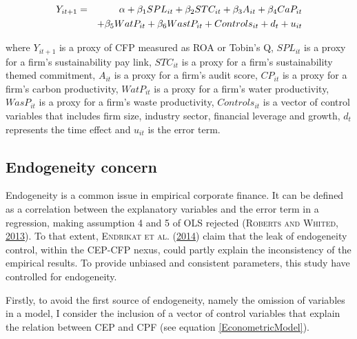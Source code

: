\documentclass[12pt,]{article}
\begin{document}
\begin{equation}
\centering
\begin{aligned}
Y_{it+1} & = & \alpha + \beta_{1} SPL_{it} + \beta_{2} STC_{it} + \beta_{3} A_{it} + \beta_{4} CaP_{it} \\
&& + { }  \beta_{5} WatP_{it} + \beta_{6} WastP_{it} + Controls_{it} + d_{t} + u_{it}
\label{EconometricModel}
\end{aligned}
\end{equation}

where \(Y_{it+1}\) is a proxy of CFP measured as ROA or Tobin's Q,
\(SPL_{it}\) is a proxy for a firm's sustainability pay link,
\(STC_{it}\) is a proxy for a firm's sustainability themed commitment,
\(A_{it}\) is a proxy for a firm's audit score, \(CP_{it}\) is a proxy
for a firm's carbon productivity, \(WatP_{it}\) is a proxy for a firm's
water productivity, \(WasP_{it}\) is a proxy for a firm's waste
productivity, \(Controls_{it}\) is a vector of control variables that
includes firm size, industry sector, financial leverage and growth,
\(d_{t}\) represents the time effect and \(u_{it}\) is the error term.

\subsection{Endogeneity concern}\label{endogeneity-concern}

Endogeneity is a common issue in empirical corporate finance. It can be
defined as a correlation between the explanatory variables and the error
term in a regression, making assumption 4 and 5 of OLS rejected
(\textsc{Roberts and Whited},
\protect\hyperlink{ref-Roberts2013}{2013}). To that extent,
\textsc{Endrikat et al.}
(\protect\hyperlink{ref-EndrikatMakingsenseconflicting2014}{2014}) claim
that the leak of endogeneity control, within the CEP-CFP nexus, could
partly explain the inconsistency of the empirical results. To provide
unbiased and consistent parameters, this study have controlled for
endogeneity.

Firstly, to avoid the first source of endogeneity, namely the omission
of variables in a model, I consider the inclusion of a vector of control
variables that explain the relation between CEP and CPF (see equation
\ref{EconometricModel}).
\end{document}
